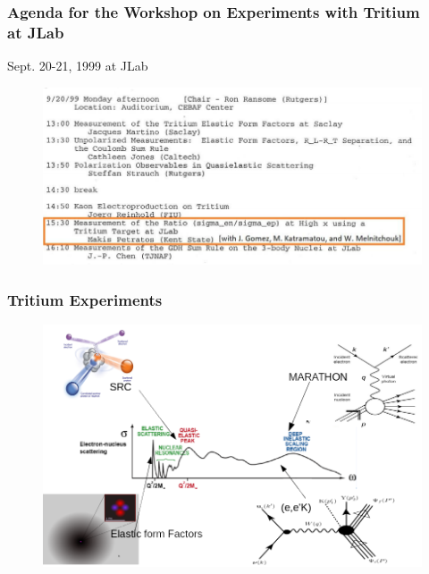 \documentclass{beamer}
\begin{document}
\begin{frame}
\frametitle{Agenda for the Workshop on Experiments with Tritium\\ at JLab}
\vspace{-15pt}
\begin{block}{Sept. 20-21, 1999 at JLab}
\begin{figure}
	\includegraphics[width =12cm]{../images/pac_agenda.png}
\end{figure}
\end{block}
\end{frame}
\begin{frame}
\frametitle{Tritium Experiments}
\vspace{-15pt}
\begin{figure}
	\includegraphics[width =12cm]{../images/tritium_ov}
\end{figure}
\end{frame}
\end{document}
